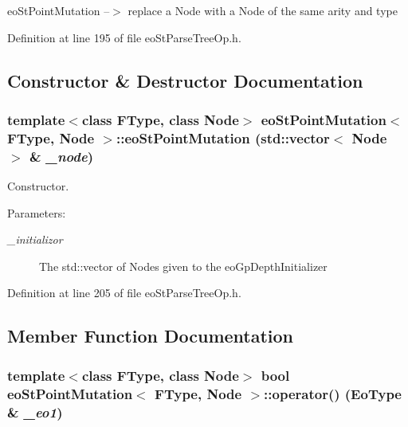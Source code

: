 eo\-St\-Point\-Mutation --$>$ replace a Node with a Node of the same arity and type 



Definition at line 195 of file eo\-St\-Parse\-Tree\-Op.h.

\subsection{Constructor \& Destructor Documentation}
\subsubsection{\setlength{\rightskip}{0pt plus 5cm}template$<$class FType, class Node$>$ {\bf eo\-St\-Point\-Mutation}$<$ FType, Node $>$::{\bf eo\-St\-Point\-Mutation} (std::vector$<$ Node $>$ \& {\em \_\-node})\hspace{0.3cm}{\tt  [inline]}}\label{classeo_st_point_mutation_a0}


Constructor. 

\begin{Desc}
\item[Parameters:]
\begin{description}
\item[{\em \_\-initializor}]The std::vector of Nodes given to the eo\-Gp\-Depth\-Initializer \end{description}
\end{Desc}


Definition at line 205 of file eo\-St\-Parse\-Tree\-Op.h.

\subsection{Member Function Documentation}
\subsubsection{\setlength{\rightskip}{0pt plus 5cm}template$<$class FType, class Node$>$ bool {\bf eo\-St\-Point\-Mutation}$<$ FType, Node $>$::operator() ({\bf Eo\-Type} \& {\em \_\-eo1})\hspace{0.3cm}{\tt  [inline]}}\label{classeo_st_point_mutation_a3}


